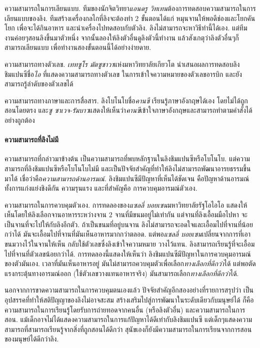 {\begin{shaded}
ความสามารถในการเลียนแบบ.
ทีมของนักจิตวิทยา\textit{แอนดรู วิทเทน}ต้องการทดสอบความสามารถในการเลียนแบบของลิง.
ทีมสร้างเครื่องกลไกที่ลิงจะต้องทำ $2$ ขั้นตอนได้แก่ หมุนจานให้พอดีช่องและโยกคันโยก เพื่อจะได้กินอาหาร
และนำเครื่องไปทดสอบกับตัวลิง.
ลิงไม่สามารถจะหาวิธีทำนี้ได้เอง.
แต่ทีมงานค่อยๆสอนลิงขึ้นมาตัวหนึ่ง
จากนั้นลองให้ลิงตัวอื่นดูลิงตัวนี้ทำงาน
แล้วสังเกตุว่าลิงตัวอื่นๆก็สามารถเลียนแบบ เพื่อทำงานสองขั้นตอนนี้ได้อย่างง่ายดาย.

ความสามารถทางตัวเลข.
\textit{เททซูโร มัตซูซาวา}แห่งมหาวิทยาลัยเกียวโต นำเสนอผลการทดสอบลิงชิมแปนซีชื่อ\textit{ไอ} ที่แสดงความสามารถทางตัวเลข ในการเข้าใจความหมายของตัวเลขอารบิก และยังสามารถรู้ลำดับของตัวเลขได้

ความสามารถทางภาษาและการสื่อสาร.
ลิงโบโนโบชื่อ\textit{คานซี} เรียนรู้ภาษาอังกฤษได้เอง โดยไม่ได้ถูกสอนโดยตรง
และ\textit{ซู ซาเวจ-รัมบาว}แสดงให้เห็นว่า\textit{คานซี}เข้าใจภาษาอังกฤษและสามารถทำตามคำสั่งได้อย่างถูกต้อง

\paragraph{\small ความสามารถที่ลิงไม่มี} 
ความสามารถที่กล่าวมาข้างต้น เป็นความสามารถที่พบหลักฐานในลิงชิมแปนซีหรือโบโนโบ.
แต่ความสามารถที่ลิงชิมแปนซีหรือโบโนโบไม่มี
และเป็นปัจจัยสำคัญที่ทำให้ลิงไม่สามารถพัฒนาอารยธรรมขึ้นมาได้
เชื่อว่าคือ\textit{ความสามารถด้านอารมณ์}.
ลิงชิมแปนซีมีปัญหาที่เห็นได้ชัดเจน คือปัญหาด้านอารมณ์ ทั้งการแก่งแย่งชิงดีกัน ความรุนแรง และที่สำคัญคือ การควบคุมอารมณ์ตัวเอง.

ความสามารถในการควบคุมตัวเอง.
การทดลองของ\textit{แซลลี่ บอยเซน}มหาวิทยาลัยรัฐโอไอโอ
แสดงให้เห็นโดยให้ลิงเลือกจานอาหารระหว่างจาน $2$ จานที่มีขนมอยู่ไม่เท่ากัน
แต่จานที่ลิงเอื้อมมือไปหา จะเป็นจานที่จะไปให้กับลิงอีกตัว.
ถ้าเป็นขนมที่อยู่บนจาน ลิงไม่สามารถจะอดใจและเอื้อมไปที่จานที่น้อยกว่าได้
มันจะเอื้อมไปที่จานที่มันเห็นอาหารมากกว่าตลอด.
แต่พอ\textit{แซลลี่ บอยเซน}เปลี่ยนจากการที่เอาขนมวางไว้ในจานให้เห็น
กลับใช้ตัวเลขซึ่งลิงเข้าใจความหมาย วางไว้แทน.
ลิงสามารถเรียนรู้ที่จะเอื้อมไปที่จานที่ตัวเลขน้อยกว่าได้.
การทดลองนี้แสดงให้เห็นว่า ลิงชิมแปนซีมีปัญหาในการควบคุมอารมณ์ของตัวมันเอง.
เวลาที่มันเห็นอาหารอยู่ มันไม่สามารถควบคุมตัวเพื่อเลือก\textit{ทางเลือกที่ดีกว่า}ได้
แต่พอตัดแรงกระตุ้นทางอารมณ์ออก (ใช้ตัวเลขวางแทนอาหารจริง) มันสามารถเลือก\textit{ทางเลือกที่ดีกว่า}ได้.

นอกจากการขาดความสามารถในการควบคุมตนเองแล้ว
ปัจจัยสำคัญอีกสองอย่างที่รายการสรุปว่า เป็นอุปสรรคที่ทำให้สติปัญญาของลิงไม่อาจสะสม สร้างเสริมไปสู่การพัฒนาในระดับเดียวกับมนุษย์ได้ ก็คือ
ความสามารถในการเรียนรู้โดยรับการถ่ายทอดจากคนอื่น (หรือลิงตัวอื่น)
และความสามารถในการสอน.
แม้เด็กอาจไม่ได้แสดงความสามารถในการแก้ปัญหาได้ดีเท่ากับลิงชิมแปนซี
แต่เด็กๆแสดงความสามารถที่สามารถเรียนรู้จากสิ่งที่ถูกสอนได้ดีกว่า
สุนัขเองก็ยังมีความสามารถในการเรียนจากการสอนของมนุษย์ได้ดีกว่าลิง.


\end{shaded}}
